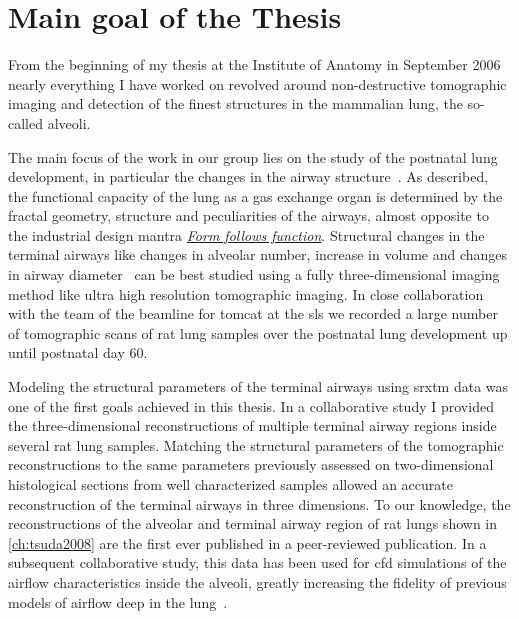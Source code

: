 \section{Main goal of the Thesis}
From the beginning of my thesis at the Institute of Anatomy in September 2006 nearly everything I have worked on revolved around non-destructive tomographic imaging and detection of the finest structures in the mammalian lung, the so-called alveoli. 

The main focus of the work in our group lies on the study of the postnatal lung development, in particular the changes in the airway structure~\cite{Burri1974}. As \citet{Weibel2009} described, the functional capacity of the lung as a gas exchange organ is determined by the fractal geometry, structure and peculiarities of the airways, almost opposite to the industrial design mantra \emph{\href{http://en.wikipedia.org/w/index.php?title=Form_follows_function&oldid=359712140}{Form follows function}}. Structural changes in the terminal airways like changes in alveolar number, increase in volume and changes in airway diameter~\cite{Burri1974} can be best studied using a fully three-dimensional imaging method like ultra high resolution tomographic imaging. In close collaboration with the team of the beamline for \ac{tomcat} at the \ac{sls} we recorded a large number of tomographic scans of rat lung samples over the postnatal lung development up until postnatal day 60.

Modeling the structural parameters of the terminal airways using \ac{srxtm} data was one of the first goals achieved in this thesis. In a collaborative study I provided the three-dimensional reconstructions of multiple terminal airway regions inside several rat lung samples. Matching the structural parameters of the tomographic reconstructions to the same parameters previously assessed on two-dimensional histological sections from well characterized samples allowed an accurate reconstruction of the terminal airways in three dimensions. To our knowledge, the reconstructions of the alveolar and terminal airway region of rat lungs shown in \autoref{ch:tsuda2008} are the first ever published in a peer-reviewed publication. In a subsequent collaborative study, this data has been used for \ac{cfd} simulations of the airflow characteristics inside the alveoli, greatly increasing the fidelity of previous models of airflow deep in the lung~\cite{Tsuda2002}.

